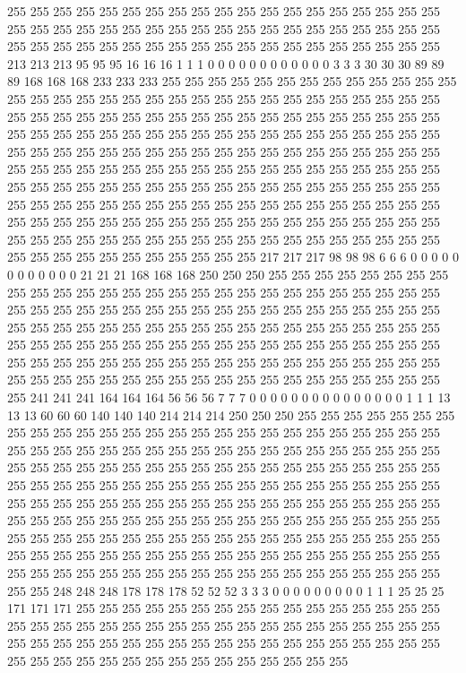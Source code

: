 255 255 255 255 255 255 255 255 255 255 255 255 255 255 255 255 255 255 255 255 255 255 255 255 255 255 255 255 255 255 255 255 255 255 255 255 255 255 255 255 255 255 255 255 255 255 255 255 255 255 255 255 255 255 255 255 255 213 213 213 95 95 95 16 16 16 1 1 1 0 0 0 0 0 0 0 0 0 0 0 0 3 3 3 30 30 30 89 89 89 168 168 168 233 233 233 255 255 255 255 255 255 255 255 255 255 255 255 255 255 255 255 255 255 255 255 255 255 255 255 255 255 255 255 255 255 255 255 
255 255 255 255 255 255 255 255 255 255 255 255 255 255 255 255 255 255 255 255 255 255 255 255 255 255 255 255 255 255 255 255 255 255 255 255 255 255 255 255 255 255 255 255 255 255 255 255 255 255 255 255 255 255 255 255 255 255 255 255 255 255 255 255 255 255 255 255 255 255 255 255 255 255 255 255 255 255 255 255 255 255 255 255 255 255 255 255 255 255 255 255 255 255 255 255 255 255 255 255 255 255 255 255 255 255 255 255 255 255 255 255 255 255 255 255 255 255 255 255 255 255 255 255 255 255 255 255 
255 255 255 255 255 255 255 255 255 255 255 255 255 255 255 255 255 255 255 255 255 255 255 255 255 255 255 255 255 255 255 255 255 255 255 217 217 217 98 98 98 6 6 6 0 0 0 0 0 0 0 0 0 0 0 0 21 21 21 168 168 168 250 250 250 255 255 255 255 255 255 255 255 255 255 255 255 255 255 255 255 255 255 255 255 255 255 255 255 255 255 255 255 255 255 255 255 255 255 255 255 255 255 255 255 255 255 255 255 255 255 255 255 255 255 255 255 255 255 255 255 255 255 255 255 255 255 255 
255 255 255 255 255 255 255 255 255 255 255 255 255 255 255 255 255 255 255 255 255 255 255 255 255 255 255 255 255 255 255 255 255 255 255 255 255 255 255 255 255 255 255 255 255 255 255 255 255 255 255 255 255 255 255 255 255 255 255 255 241 241 241 164 164 164 56 56 56 7 7 7 0 0 0 0 0 0 0 0 0 0 0 0 0 0 0 1 1 1 13 13 13 60 60 60 140 140 140 214 214 214 250 250 250 255 255 255 255 255 255 255 255 255 255 255 255 255 255 255 255 255 255 255 255 255 255 255 
255 255 255 255 255 255 255 255 255 255 255 255 255 255 255 255 255 255 255 255 255 255 255 255 255 255 255 255 255 255 255 255 255 255 255 255 255 255 255 255 255 255 255 255 255 255 255 255 255 255 255 255 255 255 255 255 255 255 255 255 255 255 255 255 255 255 255 255 255 255 255 255 255 255 255 255 255 255 255 255 255 255 255 255 255 255 255 255 255 255 255 255 255 255 255 255 255 255 255 255 255 255 255 255 255 255 255 255 255 255 255 255 255 255 255 255 255 255 255 255 255 255 255 255 255 255 255 255 
255 255 255 255 255 255 255 255 255 255 255 255 255 255 255 255 255 255 255 255 255 255 255 255 255 255 255 255 255 248 248 248 178 178 178 52 52 52 3 3 3 0 0 0 0 0 0 0 0 0 1 1 1 25 25 25 171 171 171 255 255 255 255 255 255 255 255 255 255 255 255 255 255 255 255 255 255 255 255 255 255 255 255 255 255 255 255 255 255 255 255 255 255 255 255 255 255 255 255 255 255 255 255 255 255 255 255 255 255 255 255 255 255 255 255 255 255 255 255 255 255 255 255 255 255 255 255 255 
